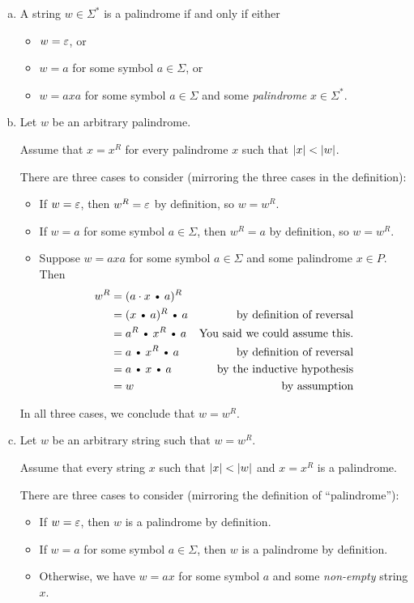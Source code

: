 \documentclass[11pt]{article}
\def\Cdot{\mathbin{\text{\normalfont \textbullet}}}
\begin{document}
\begin{solution}
\begin{enumerate}[(a)]
\item
A string $w\in\Sigma^*$ is a palindrome if and only if either
\begin{itemize}
\item $w = \varepsilon$, or
\item $w = a$ for some symbol $a\in\Sigma$, or
\item $w = axa$ for some symbol $a\in\Sigma$ and some \emph{palindrome} $x\in\Sigma^*$.
\end{itemize}


\medskip
\item
Let $w$ be an arbitrary palindrome.

Assume that $x = x^R$ for every palindrome $x$ such that $\mathopen| x \mathclose|<\mathopen| w \mathclose|$.

There are three cases to consider (mirroring the three cases in the definition):
\begin{itemize}
\item
If $w = \varepsilon$, then $w^R = \varepsilon$ by definition, so $w = w^R$.

\item
If $w = a$ for some symbol $a\in\Sigma$, then $w^R = a$ by definition, so $w = w^R$.

\item
Suppose $w = axa$ for some symbol $a\in\Sigma$ and some palindrome $x\in P$.  Then 
\begin{align*}
	w^R
	&=	(a \cdot x \Cdot a)^R		\\
	&=	(x\Cdot a)^R \Cdot a		& \text{by definition of reversal} \\
	&=	a^R \Cdot x^R \Cdot a		& \text{You said we could assume this.}\\
	&=	a \Cdot x^R \Cdot a			& \text{by definition of reversal} \\
	&=	a \Cdot x \Cdot a			& \text{by the inductive hypothesis} \\
	&=	w							& \text{by assumption}
\end{align*}
\end{itemize}
In all three cases, we conclude that $w = w^R$.


\medskip
\item
Let $w$ be an arbitrary string such that $w = w^R$.

Assume that every string $x$ such that $\mathopen| x \mathclose| < \mathopen| w \mathclose|$ and $x = x^R$ is a palindrome.

There are three cases to consider (mirroring the definition of “palindrome”):
\begin{itemize}
\item 
If $w = \varepsilon$, then $w$ is a palindrome by definition.
\item 
If $w = a$ for some symbol $a\in\Sigma$, then $w$ is a palindrome by definition.
\item
Otherwise, we have $w = ax$ for some symbol $a$ and some \emph{non-empty} string $x$.
  

\end{itemize}
\end{enumerate}
\end{solution}
\end{document}
